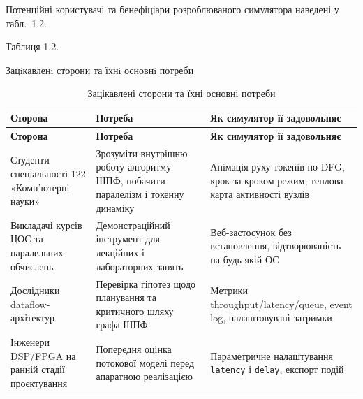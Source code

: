 Потенційні користувачі та бенефіціари розроблюваного симулятора наведені
у табл.~1.2.

Таблиця 1.2.

Зацiкавленi сторони та їхнi основнi потреби

\begin{longtable}[]{@{}
  >{\raggedright\arraybackslash}p{}
  >{\raggedright\arraybackslash}p{}
  >{\raggedright\arraybackslash}p{}@{}}
\caption[Зацікавлені сторони та їхні основні потреби]{Зацікавлені
сторони та їхні основні потреби}\tabularnewline
\toprule\noalign{}
\begin{minipage}[b]{\linewidth}\raggedright
\textbf{Сторона}
\end{minipage} & \begin{minipage}[b]{\linewidth}\raggedright
\textbf{Потреба}
\end{minipage} & \begin{minipage}[b]{\linewidth}\raggedright
\textbf{Як симулятор її задовольняє}
\end{minipage} \\
\midrule\noalign{}
\endfirsthead
\toprule\noalign{}
\begin{minipage}[b]{\linewidth}\raggedright
\textbf{Сторона}
\end{minipage} & \begin{minipage}[b]{\linewidth}\raggedright
\textbf{Потреба}
\end{minipage} & \begin{minipage}[b]{\linewidth}\raggedright
\textbf{Як симулятор її задовольняє}
\end{minipage} \\
\midrule\noalign{}
\endhead
\bottomrule\noalign{}
\endlastfoot
Студенти спеціальності 122 «Комп'ютерні науки» & Зрозуміти внутрішню
роботу алгоритму ШПФ, побачити паралелізм і токенну динаміку & Анімація
руху токенів по DFG, крок-за-кроком режим, теплова карта активності
вузлів \\
Викладачі курсів ЦОС та паралельних обчислень & Демонстраційний
інструмент для лекційних і лабораторних занять & Веб-застосунок без
встановлення, відтворюваність на будь-якій ОС \\
Дослідники dataflow-архітектур & Перевірка гіпотез щодо планування та
критичного шляху графа ШПФ & Метрики throughput/latency/queue, event
log, налаштовувані затримки \\
Інженери DSP/FPGA на ранній стадії проєктування & Попередня оцінка
потокової моделі перед апаратною реалізацією & Параметричне налаштування
\texttt{latency} і \texttt{delay}, експорт подій \\
\end{longtable}


